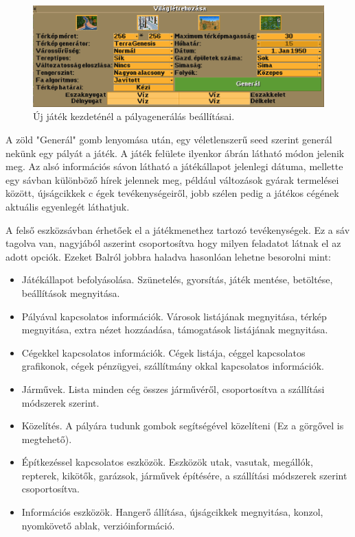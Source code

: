 \begin{figure}
	\centering
	\includegraphics[scale=0.5]{images/generalas.png}
	\caption{Új játék kezdeténél a pályagenerálás beállításai.}
	\label{fig:generalas}
\end{figure}

A zöld "Generál" gomb lenyomása után, egy véletlenszerű seed szerint generál nekünk egy pályát a játék. A játék felülete ilyenkor  ábrán látható módon jelenik meg. Az alsó információs sávon látható a játékállapot jelenlegi dátuma, mellette egy sávban különböző hírek jelennek meg, például változások gyárak termelései között, újságcikkek c égek tevékenységeiről, jobb szélen pedig a játékos cégének aktuális egyenlegét láthatjuk.

A felső eszközsávban érhetőek el a játékmenethez tartozó tevékenységek. Ez a sáv tagolva van, nagyjából aszerint csoportosítva hogy milyen feladatot látnak el az adott opciók. Ezeket Balról jobbra haladva hasonlóan lehetne besorolni mint:

\begin{itemize}
	\item Játékállapot befolyásolása. Szünetelés, gyorsítás, játék mentése, betöltése, beállítások megnyitása.
	\item Pályával kapcsolatos információk. Városok listájának megnyitása, térkép megnyitása, extra nézet hozzáadása, támogatások listájának megnyitása.
	\item Cégekkel kapcsolatos információk. Cégek listája, céggel kapcsolatos grafikonok, cégek pénzügyei, szállítmány okkal kapcsolatos információk.
	\item Járművek. Lista minden cég összes járművéről, csoportosítva a szállítási módszerek szerint.
	\item Közelítés. A pályára tudunk gombok segítségével közelíteni (Ez a görgővel is megtehető).
	\item Építkezéssel kapcsolatos eszközök. Eszközök utak, vasutak, megállók, repterek, kikötők, garázsok, járművek építésére, a szállítási módszerek szerint csoportosítva.
	\item Információs eszközök. Hangerő állítása, újságcikkek megnyitása, konzol, nyomkövető ablak, verzióinformáció.
\end{itemize}

